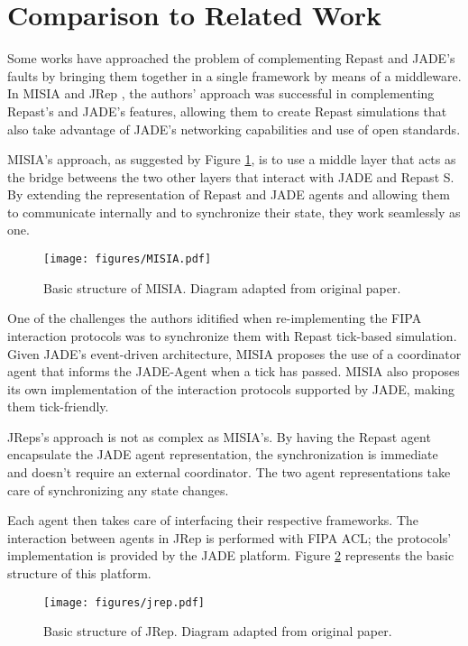 \section{Comparison to Related Work} %
\label{sec:related_work}

Some works have approached the problem of complementing Repast and JADE's faults by bringing them together in a single framework by means of a middleware. In MISIA \cite{garcia2011misia} and JRep \cite{gormer2011jrep}, the authors' approach was successful in complementing Repast's and JADE's features, allowing them to create Repast simulations that also take advantage of JADE's networking capabilities and use of open standards.

MISIA's approach, as suggested by Figure \ref{fig:misia}, is to use a middle layer that acts as the bridge betweens the two other layers that interact with JADE and Repast S. By extending the representation of Repast and JADE agents and allowing them to communicate internally and to synchronize their state,
they work seamlessly as one.

\begin{figure}[h]
	\centering
	\texttt{[image: figures/MISIA.pdf]}
	\caption{Basic structure of MISIA. Diagram
		adapted from original paper. \cite{garcia2011misia}}
	\label{fig:misia}
\end{figure}

One of the challenges the authors iditified when re-implementing the FIPA interaction protocols was to synchronize them with Repast tick-based simulation. Given JADE's event-driven architecture, MISIA proposes the use of a coordinator agent that informs the JADE-Agent when a tick has passed. MISIA also proposes its own implementation of the interaction protocols supported by JADE, making them tick-friendly.

JReps's approach is not as complex as MISIA's. By having the Repast agent encapsulate the JADE agent representation, the synchronization is immediate and doesn't require an external coordinator. The two agent representations take care of synchronizing any state changes.

Each agent then takes care of interfacing their respective frameworks. The interaction between agents in JRep is performed with FIPA ACL; the protocols' implementation is provided by the JADE platform. Figure \ref{fig:jrep} represents the basic structure of this platform.

\begin{figure}[h]
	\centering
	\texttt{[image: figures/jrep.pdf]}
	\caption{Basic structure of JRep. Diagram
		adapted from original paper. \cite{garcia2011misia}}
	\label{fig:jrep}
\end{figure}

